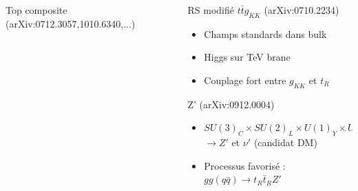 \begin{frame}
\begin{columns}
\begin{column}{0.5\textwidth}
\begin{block}{\center Top composite (arXiv:0712.3057,1010.6340,...)}
\end{block}
\pause
\end{column}
\begin{column}{0.55\textwidth}
\begin{block}{\center RS modifié $t\bar{t} g_{KK}$ (arXiv:0710.2234)}
\begin{itemize}
\item Champs standards dans bulk
\item Higgs sur TeV brane
\item Couplage fort entre $g_{KK}$ et $t_R$
\end{itemize}

\begin{figure}
\begin{center}
\end{center}
\end{figure}
\vspace*{0.2cm}

\end{block}
\pause
\begin{block}{Z'  (arXiv:0912.0004)}
\begin{itemize}
\item $SU(3)_C\times SU(2)_L\times U(1)_Y \times U(1)'$\\
$\rightarrow Z'$ et $\nu'$ (candidat DM)
\item Processus favorisé : $gg(q\bar{q})\rightarrow t_R \bar{t}_R Z'$
\end{itemize}
\end{block}
\end{column}
\end{columns}
\end{frame}

